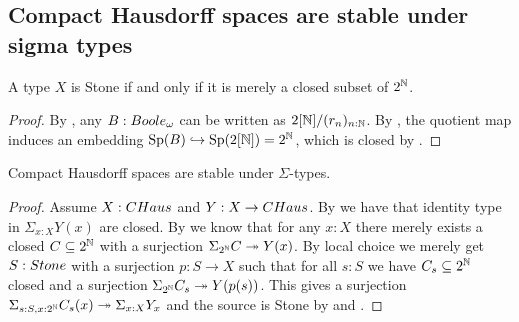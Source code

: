 \subsection{Compact Hausdorff spaces are stable under sigma types}

\begin{lemma}\label{StoneAsClosedSubsetOfCantor}
A type $X$ is Stone if and only if it is merely a closed subset of $2^{\mathbb{N}}$.
\end{lemma}
\begin{proof}
  By , any $B:\Boole$ can be written as $2[\mathbb{N}]/(r_n)_{n:\mathbb{N}}$. %
  By , the quotient map induces an embedding $\operatorname{Sp}(B)\hookrightarrow \operatorname{Sp}(2[\mathbb{N}])= 2^{\mathbb{N}}$, 
  which is closed by .
\end{proof}


\begin{lemma}\label{SigmaCompactHausdorff}
Compact Hausdorff spaces are stable under $\Sigma$-types.
\end{lemma}

\begin{proof}
Assume $X:\CHaus$ and $Y:X\to \CHaus$. By  we have that identity type in $\Sigma_{x:X}Y(x)$ are closed. By  we know that for any $x:X$ there merely exists a closed $C\subseteq 2^{\mathbb{N}}$ with a surjection $\Sigma_{2^{\mathbb{N}}}C \twoheadrightarrow Y(x)$. By local choice we merely get $S:\Stone$ with a surjection $p:S\to X$ such that for all $s:S$ we have $C_s\subseteq 2^{\mathbb{N}}$ closed and a surjection $\Sigma_{2^{\mathbb{N}}}C_s\twoheadrightarrow Y(p(s))$. This gives a surjection $\Sigma_{s:S,x:2^{\mathbb{N}}}C_s(x)\twoheadrightarrow\Sigma_{x:X}Y_x$ and the source is Stone by  and .
\end{proof}
